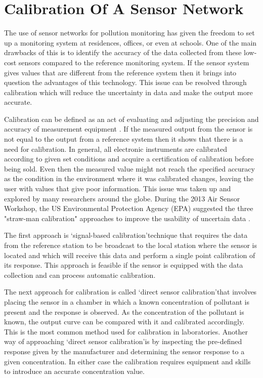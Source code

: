 \chapter{Calibration Of A Sensor Network}


The use of sensor networks for pollution monitoring has given the freedom to set up a monitoring system at residences, offices, or even at schools. One of the main drawbacks of this is to identify the accuracy of the data collected from these low-cost sensors compared to the reference monitoring system. If the sensor system gives values that are different from the reference system then it brings into question the advantages of this technology. This issue can be resolved through calibration which will reduce the uncertainty in data and make the output more accurate. 
\par 

Calibration can be defined as an act of evaluating and adjusting the precision and accuracy of measurement equipment \cite{miskell2018solution}. If the measured output from the sensor is not equal to the output from a reference system then it shows that there is a need for calibration. In general, all electronic instruments are calibrated according to given set conditions and acquire a certification of calibration before being sold. Even then the measured value might not reach the specified accuracy as the condition in the environment where it was calibrated changes, leaving the user with values that give poor information. This issue was taken up and explored by many researchers around the globe. During the 2013 Air Sensor Workshop, the US Environmental Protection Agency (EPA) suggested the three "straw-man calibration" approaches to improve the usability of uncertain data \cite{Williams2013}. 

The first approach is \lq{signal-based calibration}\rq technique that requires the data from the reference station to be broadcast to the local station where the sensor is located and which will receive this data and perform a single point calibration of its response. This approach is feasible if the sensor is equipped with the data collection and can process automatic calibration. 


The next approach for calibration is called \lq{direct sensor calibration}\rq that involves placing the sensor in a chamber in which a known concentration of pollutant is present and the response is observed. As the concentration of the pollutant is known, the output curve can be compared with it and calibrated accordingly. This is the most common method used for calibration in laboratories. Another way of approaching \lq{direct sensor calibration}\rq is by inspecting the pre-defined response given by the manufacturer and determining the sensor response to a given concentration. In either case the calibration requires equipment and skills to introduce an accurate concentration value.


